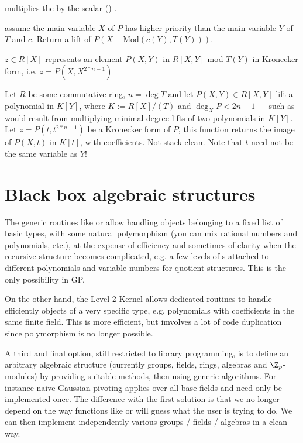  multiplies the 
 by the scalar () .






 assume the main variable
$X$ of $P$ has higher priority than the main variable $Y$ of $T$ and $c$.
Return a lift of $P(X+\text{Mod}(c(Y), T(Y)))$.

 $z\in R[X]$ represents an element
$P(X,Y)$ in $R[X,Y]$ mod $T(Y)$ in Kronecker form, i.e. $z = P(X,X^{2*n-1})$

Let $R$ be some commutative ring, $n = \deg T$ and let $P(X,Y)\in R[X,Y]$ lift
a polynomial in $K[Y]$, where $K := R[X]/(T)$ and $\deg_X P < 2n-1$ --- such as
would result from multiplying minimal degree lifts of two polynomials in
$K[Y]$. Let $z = P(t,t^{2*n-1})$ be a Kronecker form of $P$, this function
returns the image of $P(X,t)$ in $K[t]$, with  coefficients.
Not stack-clean. Note that $t$ need not be the same variable as $Y$!

\chapter{Black box algebraic structures}

The generic routines like  or  allow handling objects
belonging to a fixed list of basic types, with some natural polymorphism
(you can mix rational numbers and polynomials, etc.), at the expense of
efficiency and sometimes of clarity when the recursive structure becomes
complicated, e.g. a few levels of s attached to different
polynomials and variable numbers for quotient structures. This
is the only possibility in GP.

On the other hand, the Level 2 Kernel allows dedicated routines to handle
efficiently objects of a very specific type, e.g. polynomials with
coefficients in the same finite field. This is more efficient, but imvolves a
lot of code duplication since polymorphism is no longer possible.

A third and final option, still restricted to library programming, is to
define an arbitrary algebraic structure (currently groups, fields, rings,
algebras and $\Z_p$-modules) by providing suitable methods, then using generic
algorithms. For instance naive Gaussian pivoting applies over all base fields
and need only be implemented once. The difference with the first solution
is that we no longer depend on the way functions like  or
 will guess what the user is trying to do. We can then implement
independently various groups / fields / algebras in a clean way.

